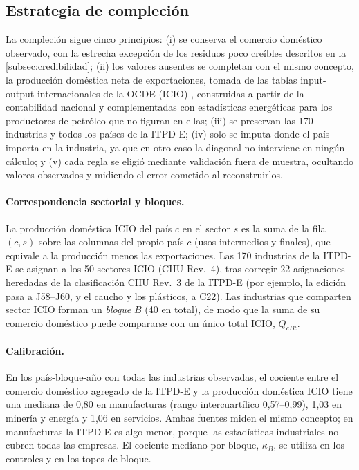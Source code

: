 \documentclass[final,1p,times,authoryear]{elsarticle}
\begin{document}
\subsection{Estrategia de compleción}
La compleción sigue cinco principios: (i) se conserva el comercio doméstico observado, con la estrecha excepción de los residuos poco creíbles descritos en la \cref{subsec:credibilidad}; (ii) los valores ausentes se completan con el mismo concepto, la producción doméstica neta de exportaciones, tomada de las tablas input-output internacionales de la OCDE (ICIO) \citep{OECDICIO}, construidas a partir de la contabilidad nacional y complementadas con estadísticas energéticas para los productores de petróleo que no figuran en ellas; (iii) se preservan las 170 industrias y todos los países de la ITPD-E; (iv) solo se imputa donde el país importa en la industria, ya que en otro caso la diagonal no interviene en ningún cálculo; y (v) cada regla se eligió mediante validación fuera de muestra, ocultando valores observados y midiendo el error cometido al reconstruirlos.

\paragraph{Correspondencia sectorial y bloques.} La producción doméstica ICIO del país $c$ en el sector $s$ es la suma de la fila $(c,s)$ sobre las columnas del propio país $c$ (usos intermedios y finales), que equivale a la producción menos las exportaciones. Las 170 industrias de la ITPD-E se asignan a los 50 sectores ICIO (CIIU Rev.~4), tras corregir 22 asignaciones heredadas de la clasificación CIIU Rev.~3 de la ITPD-E (por ejemplo, la edición pasa a J58--J60, y el caucho y los plásticos, a C22). Las industrias que comparten sector ICIO forman un \emph{bloque} $B$ (40 en total), de modo que la suma de su comercio doméstico puede compararse con un único total ICIO, $Q_{cBt}$.

\paragraph{Calibración.} En los país-bloque-año con todas las industrias observadas, el cociente entre el comercio doméstico agregado de la ITPD-E y la producción doméstica ICIO tiene una mediana de 0,80 en manufacturas (rango intercuartílico 0,57--0,99), 1,03 en minería y energía y 1,06 en servicios. Ambas fuentes miden el mismo concepto; en manufacturas la ITPD-E es algo menor, porque las estadísticas industriales no cubren todas las empresas. El cociente mediano por bloque, $\kappa_B$, se utiliza en los controles y en los topes de bloque.
\end{document}
